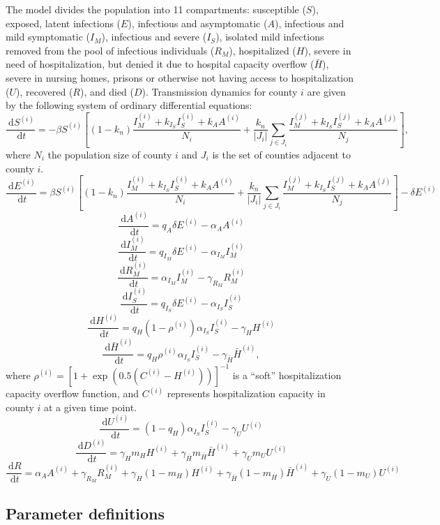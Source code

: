 \documentclass[11pt]{article}
\newcommand{\dx}[1]{\ \text{d} #1}
\begin{document}
The model divides the population into 11 compartments: susceptible ($S$), exposed, latent infections ($E$), infectious and asymptomatic ($A$), infectious and mild symptomatic ($I_M$), infectious and severe ($I_S$), isolated mild infections removed from the pool of infectious individuals ($R_M$), hospitalized ($H$), severe in need of hospitalization, but denied it due to hospital capacity overflow ($\bar{H}$), severe in nursing homes, prisons or otherwise not having access to hospitalization ($U$), recovered ($R$), and died ($D$).  Transmission dynamics for county $i$  are given by the following system of ordinary differential equations: 
\[ \frac{\dx{S^{(i)}}}{\dx{t}} = -\beta S^{(i)} \left[ (1-k_n) \frac{ I_M^{(i)} + k_{I_S} I_S^{(i)} + k_A A^{(i)}}{N_i} + \frac{k_n}{|J_i|} \sum_{j\in J_i}  \frac{I_M^{(j)} + k_{I_S} I_S^{(j)} + k_A A^{(j)}}{N_j} \right], \]
where $N_i$ the population size of county $i$ and $J_i$ is the set of counties adjacent to county $i$.
\[ \frac{\dx{E^{(i)}}}{\dx{t}} = \beta S^{(i)} \left[ (1-k_n) \frac{ I_M^{(i)} + k_{I_S} I_S^{(i)} + k_A A^{(i)}}{N_i} + \frac{k_n}{|J_i|} \sum_{j\in J_i}  \frac{I_M^{(j)} + k_{I_S} I_S^{(j)} + k_A A^{(j)}}{N_j} \right] - \delta E^{(i)} \]
\[ \frac{\dx{A^{(i)}}}{\dx{t}} = q_A \delta E^{(i)} - \alpha_A A^{(i)} \]
\[ \frac{\dx{I_M^{(i)}}}{\dx{t}} = q_{I_M} \delta E^{(i)} - \alpha_{I_M} I_M^{(i)} \]
\[ \frac{\dx{R_M^{(i)}}}{\dx{t}} = \alpha_{I_M} I_M^{(i)} - \gamma_{R_M} R_M^{(i)} \]
\[ \frac{\dx{I_S^{(i)}}}{\dx{t}} = q_{I_S} \delta E^{(i)} - \alpha_{I_S} I_S^{(i)} \]
\[ \frac{\dx{H^{(i)}}}{\dx{t}} =  q_H (1 - \rho^{(i)}) \alpha_{I_S} I_S^{(i)} - \gamma_H H^{(i)}  \]
\[ \frac{\dx{\bar{H}^{(i)}}}{\dx{t}} =  q_H \rho^{(i)} \alpha_{I_S} I_S^{(i)} - \gamma_{\bar{H}} \bar{H}^{(i)},  \]
where $\rho^{(i)} = \left[ 1+\exp(0.5(C^{(i)}-H^{(i)})) \right]^{-1}$ is a ``soft'' hospitalization capacity overflow function, and $C^{(i)}$ represents hospitalization capacity in county $i$ at a given time point.
\[ \frac{\dx{U^{(i)}}}{\dx{t}} =  (1 - q_H) \alpha_{I_S} I_S^{(i)} - \gamma_{U} U^{(i)}  \]
\[ \frac{\dx{D^{(i)}}}{\dx{t}} = \gamma_H m_H H^{(i)} + \gamma_{\bar{H}}  m_{\bar{H}} \bar{H}^{(i)} + \gamma_{U} m_{U} U^{(i)} \]
\[ \frac{\dx{R}}{\dx{t}} = \alpha_A A^{(i)} + \gamma_{R_M} R_M^{(i)} + \gamma_H (1-m_H) H^{(i)} + \gamma_{\bar{H}} (1 - m_{\bar{H}}) \bar{H}^{(i)} + \gamma_{U} (1- m_{U}) U^{(i)}  \]




\subsection{Parameter definitions}
\end{document}
